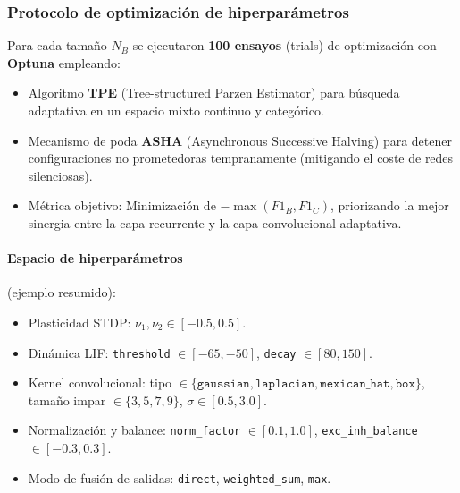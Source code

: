 \subsubsection{Protocolo de optimización de hiperparámetros}
Para cada tamaño $N_B$ se ejecutaron \textbf{100 ensayos} (trials) de optimización con \textbf{Optuna} empleando:
\begin{itemize}
    \item Algoritmo \textbf{TPE} (Tree-structured Parzen Estimator) para búsqueda adaptativa en un espacio mixto continuo y categórico.
    \item Mecanismo de poda \textbf{ASHA} (Asynchronous Successive Halving) para detener configuraciones no prometedoras tempranamente (mitigando el coste de redes silenciosas).
    \item Métrica objetivo: Minimización de $-\max(F1_B, F1_C)$, priorizando la mejor sinergia entre la capa recurrente y la capa convolucional adaptativa.
\end{itemize}

\paragraph{Espacio de hiperparámetros} (ejemplo resumido):
\begin{itemize}
    \item Plasticidad STDP: $\nu_1, \nu_2 \in [-0.5, 0.5]$.
    \item Dinámica LIF: \texttt{threshold} $\in [-65, -50]$, \texttt{decay} $\in [80, 150]$.
    \item Kernel convolucional: tipo $\in \{\texttt{gaussian}, \texttt{laplacian}, \texttt{mexican\_hat}, \texttt{box}\}$, tamaño impar $\in \{3,5,7,9\}$, $\sigma \in [0.5, 3.0]$.
    \item Normalización y balance: \texttt{norm\_factor} $\in [0.1,1.0]$, \texttt{exc\_inh\_balance} $\in [-0.3,0.3]$.
    \item Modo de fusión de salidas: \texttt{direct}, \texttt{weighted\_sum}, \texttt{max}.
\end{itemize}

